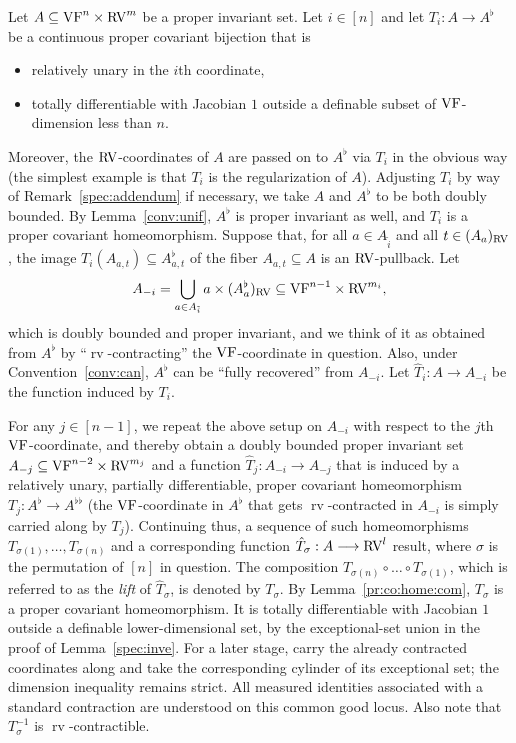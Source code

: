 \documentclass[12pt]{amsart}
\newcommand{\memph}[1]{{\color{magenta}\emph{#1}}}
\theoremstyle{plain}
\theoremstyle{definition}
\theoremstyle{remark}
\numberwithin{equation}{section}
\theoremstyle{plain}
\newcommand{\VF}{\textup{VF}}
\newcommand{\RV}{\textup{RV}}
\newcommand{\0}{\emptyset}
\newcommand{\fun}{\longrightarrow}
\newcommand{\sub}{\subseteq}
\DeclareMathOperator{\rv}{rv}
\begin{document}
Let $A \sub \VF^{n} \times \RV^{m}$ be a proper invariant set. Let $i\in[n]$ and let $T_i:A\fun A^\flat$ be a continuous proper covariant bijection that is
\begin{itemize}
  \item relatively unary in the $i$th coordinate,
  \item totally differentiable with Jacobian $1$ outside a definable subset of $\VF$-dimension less than $n$.
\end{itemize}
Moreover, the $\RV$-coordinates of $A$ are passed on to $A^\flat$ via $T_i$ in the obvious way (the simplest example is that $T_i$ is the regularization of $A$). Adjusting $T_i$ by way of Remark~\ref{spec:addendum} if necessary, we take $A$ and $A^\flat$ to be both doubly bounded. By Lemma~\ref{conv:unif}, $A^\flat$ is proper invariant as well, and $T_i$ is a proper covariant homeomorphism. Suppose that, for all $a \in A_{\tilde i}$ and all $t \in (A_{a})_{\RV}$, the image $T_i(A_{a, t}) \sub A_{a, t}^\flat$ of the fiber $A_{a, t} \sub A$ is an $\RV$-pullback.  Let
\[
 A_{-i} = \bigcup_{a \in A_{\tilde i}} a \times (A_{a}^\flat)_{\RV} \sub \VF^{n-1} \times \RV^{m_i},
\]
which is doubly bounded and proper invariant, and  we think of it as obtained from $A^\flat$ by ``$\rv$-contracting'' the $\VF$-coordinate in question.  Also, under Convention~\ref{conv:can}, $A^\flat$ can be ``fully recovered'' from  $A_{-i}$. Let $\hat T_i : A \fun A_{-i}$ be the function induced by $T_i$.

For any $j \in [n{-}1]$, we repeat the above setup on $A_{-i}$ with respect to the $j$th $\VF$-coordinate, and thereby obtain a doubly bounded proper invariant set $A_{-j} \sub \VF^{n-2} \times \RV^{m_j}$ and a function $\hat T_{j} : A_{-i} \fun A_{-j}$ that is induced by a relatively unary, partially differentiable, proper covariant homeomorphism $T_j : A^\flat \fun A^{\flat\flat}$ (the $\VF$-coordinate in $A^\flat$ that gets $\rv$-contracted in $A_{-i}$ is simply carried along by $T_j$). Continuing thus,  a sequence of such homeomorphisms  $T_{\sigma(1)}, \ldots, T_{\sigma(n)}$ and a corresponding function $\hat T_{\sigma} : A \fun \RV^{l}$ result, where $\sigma$ is the permutation of $[n]$ in question. The composition $T_{\sigma(n)} \circ \ldots \circ T_{\sigma(1)}$, which is referred to as the \memph{lift} of $\hat T_{\sigma}$, is denoted by $T_{\sigma}$. By Lemma~\ref{pr:co:home:com}, $T_{\sigma}$ is a proper covariant homeomorphism. It is totally differentiable with Jacobian $1$ outside a definable lower-dimensional set, by the exceptional-set union in the proof of Lemma~\ref{spec:inve}. For a later stage, carry the already contracted coordinates along and take the corresponding cylinder of its exceptional set; the dimension inequality remains strict. All measured identities associated with a standard contraction are understood on this common good locus. Also note that $T^{-1}_{\sigma}$ is $\rv$-contractible.
\end{document}

